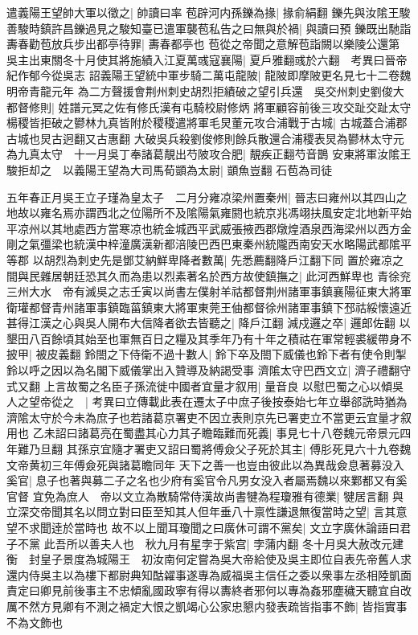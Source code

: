 遣義陽王望帥大軍以徵之|{
	帥讀曰率}
苞辟河内孫鑠為掾|{
	掾俞絹翻}
鑠先與汝隂王駿善駿時鎮許昌鑠過見之駿知臺已遣軍襲苞私告之曰無與於禍|{
	與讀曰預}
鑠既出馳詣夀春勸苞放兵步出都亭待罪|{
	夀春都亭也}
苞從之帝聞之意解苞詣闕以樂陵公還第　吳主出東關冬十月使其將施績入江夏萬彧寇襄陽|{
	夏戶雅翻彧於六翻　考異曰晉帝紀作郁今從吳志}
詔義陽王望統中軍步騎二萬屯龍陂|{
	龍陂即摩陂更名見七十二卷魏明帝青龍元年}
為二方聲援會荆州刺史胡烈拒績破之望引兵還　吳交州刺史劉俊大都督修則|{
	姓譜元冥之佐有修氏漢有屯騎校尉修炳}
將軍顧容前後三攻交趾交趾太守楊稷皆拒破之鬰林九真皆附於稷稷遣將軍毛炅董元攻合浦戰于古城|{
	古城蓋合浦郡古城也炅古迥翻又古惠翻}
大破吳兵殺劉俊修則餘兵散還合浦稷表炅為鬰林太守元為九真太守　十一月吳丁奉諸葛靚出芍陂攻合肥|{
	靚疾正翻芍音鵲}
安東將軍汝隂王駿拒却之　以義陽王望為大司馬荀顗為太尉|{
	顗魚豈翻}
石苞為司徒

五年春正月吳王立子瑾為皇太子　二月分雍凉梁州置秦州|{
	晉志曰雍州以其四山之地故以雍名焉亦謂西北之位陽所不及隂陽氣雍閼也統京兆馮翊扶風安定北地新平始平凉州以其地處西方當寒凉也統金城西平武威張掖西郡燉煌酒泉西海梁州以西方金剛之氣彊梁也統漢中梓潼廣漢新都涪陵巴西巴東秦州統隴西南安天水略陽武都隂平等郡}
以胡烈為刺史先是鄧艾納鮮卑降者數萬|{
	先悉薦翻降戶江翻下同}
置於雍凉之間與民雜居朝廷恐其久而為患以烈素著名於西方故使鎮撫之|{
	此河西鮮卑也}
青徐兖三州大水　帝有滅吳之志壬寅以尚書左僕射羊祜都督荆州諸軍事鎮襄陽征東大將軍衛瓘都督青州諸軍事鎮臨菑鎮東大將軍東莞王伷都督徐州諸軍事鎮下邳祜綏懷遠近甚得江漢之心與吳人開布大信降者欲去皆聽之|{
	降戶江翻}
減戍邏之卒|{
	邏郎佐翻}
以墾田八百餘頃其始至也軍無百日之糧及其季年乃有十年之積祜在軍常輕裘緩帶身不披甲|{
	被皮義翻}
鈴閤之下侍衛不過十數人|{
	鈴下卒及閤下威儀也鈴下者有使令則掣鈴以呼之因以為名閣下威儀掌出入贊導及納謁受事}
濟隂太守巴西文立|{
	濟子禮翻守式又翻}
上言故蜀之名臣子孫流徙中國者宜量才叙用|{
	量音良}
以慰巴蜀之心以傾吳人之望帝從之　|{
	考異曰立傳載此表在遷太子中庶子後按泰始七年立舉郤詵時猶為濟隂太守於今未為庶子也若諸葛京署吏不因立表則京先已署吏立不當更云宜量才叙用也}
乙未詔曰諸葛亮在蜀盡其心力其子瞻臨難而死義|{
	事見七十八卷魏元帝景元四年難乃旦翻}
其孫京宜隨才署吏又詔曰蜀將傅僉父子死於其主|{
	傅肜死見六十九卷魏文帝黄初三年傅僉死與諸葛瞻同年}
天下之善一也豈由彼此以為異哉僉息著募没入奚官|{
	息子也著與募二子之名也少府有奚官令凡男女没入者屬焉魏以來鄴都又有奚官督}
宜免為庶人　帝以文立為散騎常侍漢故尚書犍為程瓊雅有德業|{
	犍居言翻}
與立深交帝聞其名以問立對曰臣至知其人但年垂八十禀性謙退無復當時之望|{
	言其意望不求聞逹於當時也}
故不以上聞耳瓊聞之曰廣休可謂不黨矣|{
	文立字廣休論語曰君子不黨}
此吾所以善夫人也　秋九月有星孛于紫宫|{
	孛蒲内翻}
冬十月吳大赦改元建衡　封皇子景度為城陽王　初汝南何定嘗為吳大帝給使及吳主即位自表先帝舊人求還内侍吳主以為樓下都尉典知酤糴事遂專為威福吳主信任之委以衆事左丞相陸凱面責定曰卿見前後事主不忠傾亂國政寧有得以夀終者邪何以專為姦邪塵穢天聽宜自改厲不然方見卿有不測之禍定大恨之凱竭心公家忠懇内發表疏皆指事不飾|{
	皆指實事不為文飾也}

